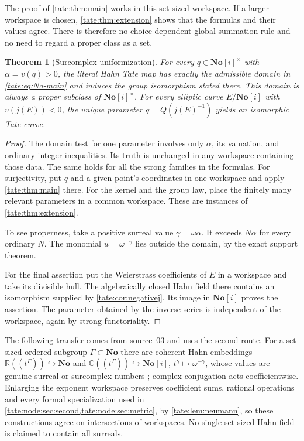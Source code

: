 \documentclass[11pt,letterpaper]{article}
\newtheorem{theorem}{Theorem}[section]
\theoremstyle{definition}
\newcommand{\C}{\mathbb C}
\newcommand{\R}{\mathbb R}
\newcommand{\No}{\mathbf{No}}
\begin{document}
The proof of \cref{tate:thm:main} works in this set-sized workspace. If a
larger workspace is chosen, \cref{tate:thm:extension} shows that the formulas
and their values agree. There is therefore no choice-dependent global
summation rule and no need to regard a proper class as a set.

\begin{theorem}[Surcomplex uniformization]\label{tate:thm:surcomplex}
For every $q\in\No[i]^\times$ with $\alpha=v(q)>0$, the literal Hahn
Tate map has exactly the admissible domain in \eqref{tate:eq:No-main} and
induces the group isomorphism stated there. This domain is always a
proper subclass of $\No[i]^\times$.
For every elliptic curve $E/\No[i]$ with $v(j(E))<0$, the unique
parameter $q=Q(j(E)^{-1})$ yields an isomorphic Tate curve.
\end{theorem}

\begin{proof}
The domain test for one parameter involves only $\alpha$, its valuation,
and ordinary integer inequalities. Its truth is unchanged in any
workspace containing those data. The same holds for all the strong
families in the formulas. For surjectivity, put $q$ and a given point's
coordinates in one workspace and apply \cref{tate:thm:main} there. For the
kernel and the group law, place the finitely many relevant parameters
in a common workspace. These are instances of \cref{tate:thm:extension}.

To see properness, take a positive surreal value
$\gamma=\omega\alpha$. It exceeds $N\alpha$ for every ordinary $N$.
The monomial $u=\omega^{-\gamma}$ lies outside the domain, by the exact
support theorem.

For the final assertion put the Weierstrass coefficients of $E$ in a
workspace and take its divisible hull. The algebraically closed Hahn
field there contains an isomorphism supplied by
\cref{tate:cor:negativej}. Its image in $\No[i]$ proves the assertion.
The parameter obtained by the inverse series is independent of the
workspace, again by strong functoriality.
\end{proof}

The following transfer comes from source~03 and uses the second route. For a
set-sized ordered subgroup $\Gamma\subset\No$ there are coherent Hahn
embeddings $\R((t^\Gamma))\hookrightarrow\No$ and
$\C((t^\Gamma))\hookrightarrow\No[i]$, $t^\gamma\mapsto\omega^{-\gamma}$,
whose values are genuine surreal or surcomplex numbers
\cite{Gonshor,BM}; complex conjugation acts coefficientwise. Enlarging the
exponent workspace preserves coefficient sums, rational operations and every
formal specialization used in
\cref{tate:node:sec:second,tate:node:sec:metric}, by
\cref{tate:lem:neumann}, so these constructions agree on intersections of
workspaces. No single set-sized Hahn field is claimed to contain all
surreals.
\end{document}
